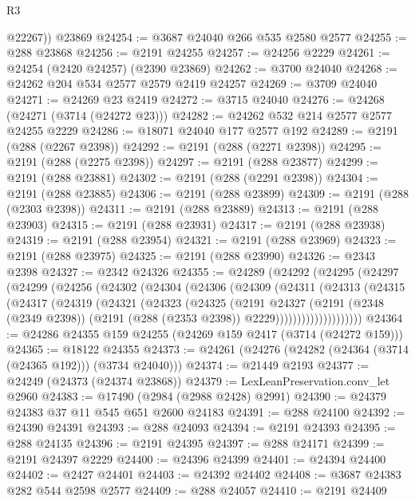 \begin{lexlean}{R3}
\begin{coremodule}
        @22267))
    @23869
@24254 := @3687 @24040 @266 @535 @2580 @2577
@24255 := @288 @23868
@24256 := @2191 @24255
@24257 := @24256 @2229
@24261 := @24254 (@2420 @24257) (@2390 @23869)
@24262 := @3700 @24040
@24268 := @24262 @204 @534 @2577 @2579 @2419 @24257
@24269 := @3709 @24040
@24271 := @24269 @23 @2419
@24272 := @3715 @24040
@24276 := @24268 (@24271 (@3714 (@24272 @23)))
@24282 := @24262 @532 @214 @2577 @2577 @24255 @2229
@24286 := @18071 @24040 @177 @2577 @192
@24289 := @2191 (@288 (@2267 @2398))
@24292 := @2191 (@288 (@2271 @2398))
@24295 := @2191 (@288 (@2275 @2398))
@24297 := @2191 (@288 @23877)
@24299 := @2191 (@288 @23881)
@24302 := @2191 (@288 (@2291 @2398))
@24304 := @2191 (@288 @23885)
@24306 := @2191 (@288 @23899)
@24309 := @2191 (@288 (@2303 @2398))
@24311 := @2191 (@288 @23889)
@24313 := @2191 (@288 @23903)
@24315 := @2191 (@288 @23931)
@24317 := @2191 (@288 @23938)
@24319 := @2191 (@288 @23954)
@24321 := @2191 (@288 @23969)
@24323 := @2191 (@288 @23975)
@24325 := @2191 (@288 @23990)
@24326 := @2343 @2398
@24327 := @2342 @24326
@24355 := @24289
    (@24292
      (@24295
        (@24297
          (@24299
            (@24256
              (@24302
                (@24304
                  (@24306
                    (@24309
                      (@24311
                        (@24313
                          (@24315
                            (@24317
                              (@24319
                                (@24321
                                  (@24323
                                    (@24325
                                      (@2191
                                        @24327
                                        (@2191
                                          (@2348 (@2349 @2398))
                                          (@2191 (@288 (@2353 @2398)) @2229))))))))))))))))))))
@24364 := @24286 @24355 @159 @24255 (@24269 @159 @2417 (@3714 (@24272 @159)))
@24365 := @18122 @24355
@24373 := @24261 (@24276 (@24282 (@24364 (@3714 (@24365 @192))) (@3734 @24040)))
@24374 := @21449 @2193
@24377 := @24249 (@24373 (@24374 @23868))
@24379 := LexLeanPreservation.conv_let @2960
@24383 := @17490 (@2984 (@2988 @2428) @2991)
@24390 := @24379 @24383 @37 @11 @545 @651 @2600 @24183
@24391 := @288 @24100
@24392 := @24390 @24391
@24393 := @288 @24093
@24394 := @2191 @24393
@24395 := @288 @24135
@24396 := @2191 @24395
@24397 := @288 @24171
@24399 := @2191 @24397 @2229
@24400 := @24396 @24399
@24401 := @24394 @24400
@24402 := @2427 @24401
@24403 := @24392 @24402
@24408 := @3687 @24383 @282 @544 @2598 @2577
@24409 := @288 @24057
@24410 := @2191 @24409

\end{coremodule}
\end{lexlean}
